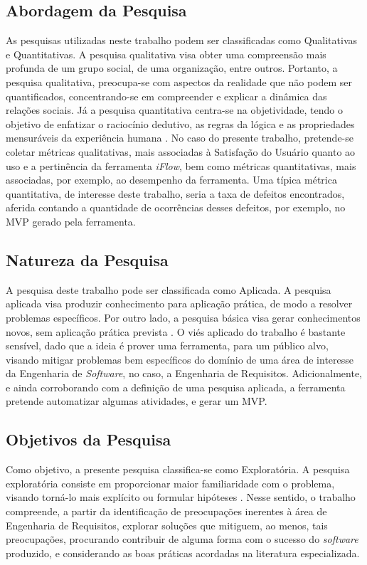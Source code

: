 \subsection{Abordagem da Pesquisa}
As pesquisas utilizadas neste trabalho podem ser classificadas como Qualitativas e Quantitativas. A pesquisa qualitativa visa obter uma compreensão mais profunda de um grupo social, de uma organização, entre outros. Portanto, a pesquisa qualitativa, preocupa-se com aspectos da realidade que não podem ser quantificados, concentrando-se em compreender e explicar a dinâmica das relações sociais. Já a pesquisa quantitativa centra-se na objetividade, tendo o objetivo de enfatizar o raciocínio dedutivo, as regras da lógica e as propriedades mensuráveis da experiência humana \cite{gerhardt2009metodos}. No caso do presente trabalho, pretende-se coletar métricas qualitativas, mais associadas à Satisfação do Usuário quanto ao uso e a pertinência da ferramenta \textit{iFlow}, bem como métricas quantitativas, mais associadas, por exemplo, ao desempenho da ferramenta. Uma típica métrica quantitativa, de interesse deste trabalho, seria a taxa de defeitos encontrados, aferida contando a quantidade de ocorrências desses defeitos, por exemplo, no MVP gerado pela ferramenta.

\subsection{Natureza da Pesquisa}
A pesquisa deste trabalho pode ser classificada como Aplicada. A pesquisa aplicada visa produzir conhecimento para aplicação prática, de modo a resolver problemas específicos. Por outro lado, a pesquisa básica visa gerar conhecimentos novos, sem aplicação prática prevista \cite{gerhardt2009metodos}. O viés aplicado do trabalho é bastante sensível, dado que a ideia é prover uma ferramenta, para um público alvo, visando mitigar problemas bem específicos do domínio de uma área de interesse da Engenharia de \textit{Software}, no caso, a Engenharia de Requisitos. Adicionalmente, e ainda corroborando com a definição de uma pesquisa aplicada, a ferramenta pretende automatizar algumas atividades, e gerar um MVP.

\subsection{Objetivos da Pesquisa}
Como objetivo, a presente pesquisa classifica-se como Exploratória. A pesquisa exploratória consiste em proporcionar maior familiaridade com o problema, visando torná-lo mais explícito ou formular hipóteses \cite{gil2002elaborar}. Nesse sentido, o trabalho compreende, a partir da identificação de preocupações inerentes à área de Engenharia de Requisitos, explorar soluções que mitiguem, ao menos, tais preocupações, procurando contribuir de alguma forma com o sucesso do \textit{software} produzido, e considerando as boas práticas acordadas na literatura especializada.


